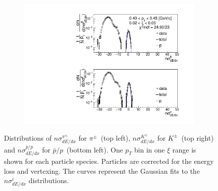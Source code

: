 \begin{figure}[h!]
\begin{subfigure}{.49\textwidth}
		\includegraphics[width=\linewidth, page=5]{chapters/chrgSTAR/img/dEdx/fit2019_thirdStep_2_0.pdf}
	\end{subfigure}
	\begin{minipage}{.49\textwidth}
		\caption[Distributions of $n\sigma^{\pi^\pm}_{dE/dx}$ for $\pi^\pm$, $n\sigma^{K^\pm}_{dE/dx}$ for $K^\pm$ and $n\sigma^{\bar{p}/p}_{dE/dx}$ for $\bar{p}/p$]{Distributions of $n\sigma^{\pi^\pm}_{dE/dx}$ for $\pi^\pm$~(top left), $n\sigma^{K^\pm}_{dE/dx}$ for $K^\pm$~(top right) and $n\sigma^{\bar{p}/p}_{dE/dx}$ for $\bar{p}/p$~(bottom left). One $p_T$ bin in one $\xi$ range is shown for each particle species. Particles are corrected for the energy loss and vertexing. The curves represent the Gaussian fits to the $n\sigma^{i}_{dE/dx}$ distributions.}
		\label{fig:dEdx_fit_example}
	\end{minipage}
	
\end{figure}


